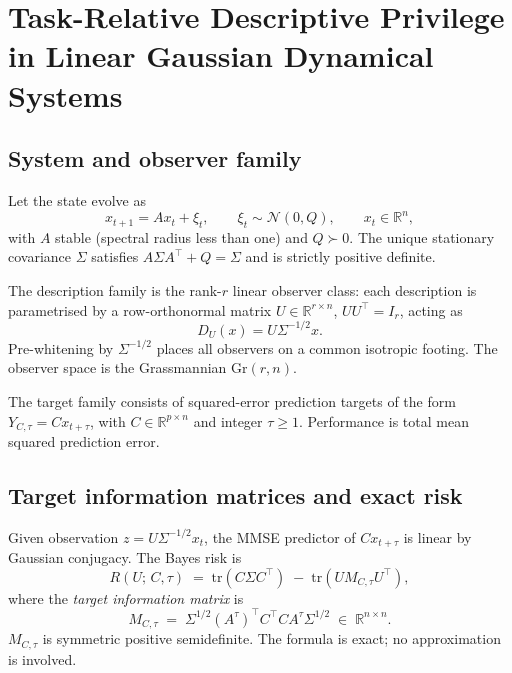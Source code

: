 \documentclass[11pt]{article}
\begin{document}

\section{Task-Relative Descriptive Privilege in Linear Gaussian Dynamical Systems}
\label{sec:theorem}

\subsection{System and observer family}

Let the state evolve as
\begin{equation}
    x_{t+1} = A x_t + \xi_t,
    \qquad \xi_t \sim \mathcal{N}(0, Q),
    \qquad x_t \in \mathbb{R}^n,
\end{equation}
with $A$ stable (spectral radius less than one) and $Q \succ 0$.
The unique stationary covariance $\Sigma$ satisfies $A\Sigma A^\top + Q = \Sigma$
and is strictly positive definite.

The description family is the rank-$r$ linear observer class:
each description is parametrised by a row-orthonormal matrix
$U \in \mathbb{R}^{r \times n}$, $UU^\top = I_r$, acting as
\begin{equation}
    D_U(x) = U \Sigma^{-1/2} x.
\end{equation}
Pre-whitening by $\Sigma^{-1/2}$ places all observers on a common isotropic
footing.
The observer space is the Grassmannian $\mathrm{Gr}(r,n)$.

The target family consists of squared-error prediction targets of the form
$Y_{C,\tau} = C x_{t+\tau}$,
with $C \in \mathbb{R}^{p \times n}$ and integer $\tau \geq 1$.
Performance is total mean squared prediction error.

\subsection{Target information matrices and exact risk}

Given observation $z = U\Sigma^{-1/2}x_t$,
the MMSE predictor of $Cx_{t+\tau}$ is linear by Gaussian conjugacy.
The Bayes risk is
\begin{equation}
    R(U;\, C, \tau)
    \;=\;
    \mathrm{tr}(C\Sigma C^\top)
    \;-\;
    \mathrm{tr}\!\left(U M_{C,\tau} U^\top\right),
    \label{eq:bayes-risk}
\end{equation}
where the \emph{target information matrix} is
\begin{equation}
    M_{C,\tau}
    \;=\;
    \Sigma^{1/2}(A^\tau)^\top C^\top C A^\tau \Sigma^{1/2}
    \;\in\; \mathbb{R}^{n \times n}.
    \label{eq:info-matrix}
\end{equation}
$M_{C,\tau}$ is symmetric positive semidefinite.
The formula is exact; no approximation is involved.
\end{document}
